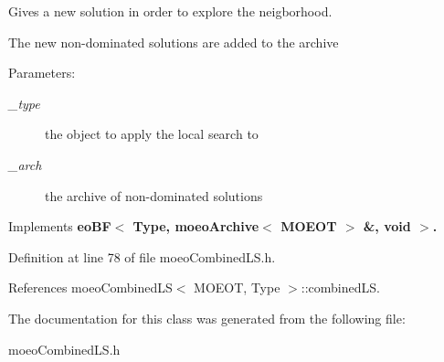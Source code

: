 Gives a new solution in order to explore the neigborhood. 

The new non-dominated solutions are added to the archive \begin{Desc}
\item[Parameters:]
\begin{description}
\item[{\em \_\-type}]the object to apply the local search to \item[{\em \_\-arch}]the archive of non-dominated solutions \end{description}
\end{Desc}


Implements \bf{eo\-BF$<$ Type, moeo\-Archive$<$ MOEOT $>$ \&, void $>$}.

Definition at line 78 of file moeo\-Combined\-LS.h.

References moeo\-Combined\-LS$<$ MOEOT, Type $>$::combined\-LS.

The documentation for this class was generated from the following file:\begin{CompactItemize}
\item 
moeo\-Combined\-LS.h\end{CompactItemize}
